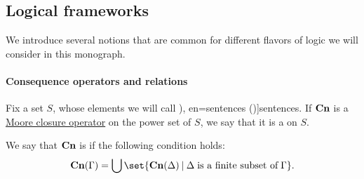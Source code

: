 \subsection{Logical frameworks}\label{subsec:logical_frameworks}

We introduce several notions that are common for different flavors of logic we will consider in this monograph.

\paragraph{Consequence operators and relations}

\begin{definition}\label{def:consequence_operator}\mimprovised
  Fix a set \( S \), whose elements we will call \term[ru=предложения (\cite[103]{КолмогоровДрагалин2006}), en=sentences (\cite[63]{Woodger1983Tarski})]{sentences}. If \( \op*{Cn} \) is a \hyperref[def:moore_closure_operator]{Moore closure operator} on the power set of \( S \), we say that it is a  on \( S \).

  \begin{thmenum}
     We say that \( \op*{Cn} \) is  if the following condition holds:
    \begin{equation}\label{eq:def:consequence_operator/compactness}
      \op*{Cn}(\Gamma) = \bigcup\set{ \op*{Cn}(\Delta) \given \Delta \T{is a finite subset of} \Gamma }.
    \end{equation}
  \end{thmenum}
\end{definition}
